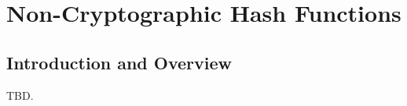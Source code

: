\chapter[Non-Cryptographic Hash Functions]
        {Non-Cryptographic Hash Functions}
\label{ccrc0}

\section{Introduction and Overview}
\label{ccrc0:siov0}

TBD.

